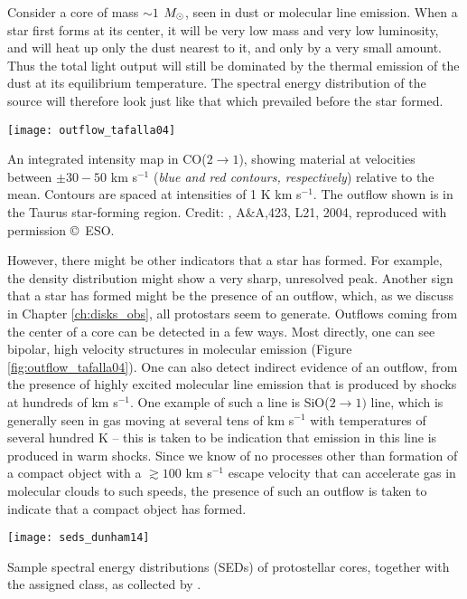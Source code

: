 Consider a core of mass $\sim 1$ $M_{\odot}$, seen in dust or molecular line emission. When a star first forms at its center, it will be very low mass and very low luminosity, and will heat up only the dust nearest to it, and only by a very small amount. Thus the total light output will still be dominated by the thermal emission of the dust at its equilibrium temperature. The spectral energy distribution of the source will therefore look just like that which prevailed before the star formed.

\begin{marginfigure}
\texttt{[image: outflow\_tafalla04]}
\caption[Outflow in CO($2\rightarrow 1$)]{
\label{fig:outflow_tafalla04}
An integrated intensity map in CO($2\rightarrow 1$), showing material at velocities between $\pm 30-50$ km s$^{-1}$ (\textit{blue and red contours, respectively}) relative to the mean. Contours are spaced at intensities of 1 K km s$^{-1}$. The outflow shown is in the Taurus star-forming region. Credit: \citeauthor{tafalla04c}, A\&A,423, L21, 2004, reproduced with permission \copyright\, ESO.
}
\end{marginfigure}

However, there might be other indicators that a star has formed. For example, the density distribution might show a very sharp, unresolved peak. Another sign that a star has formed might be the presence of an outflow, which, as we discuss in Chapter \ref{ch:disks_obs}, all protostars seem to generate. Outflows coming from the center of a core can be detected in a few ways. Most directly, one can see bipolar, high velocity structures in molecular emission (Figure \ref{fig:outflow_tafalla04}). One can also detect indirect evidence of an outflow, from the presence of highly excited molecular line emission that is produced by shocks at hundreds of km s$^{-1}$. One example of such a line is SiO($2\rightarrow 1)$ line, which is generally seen in gas moving at several tens of km s$^{-1}$ with temperatures of several hundred K -- this is taken to be indication that emission in this line is produced in warm shocks. Since we know of no processes other than formation of a compact object with a $\gtrsim 100$ km s$^{-1}$ escape velocity that can accelerate gas in molecular clouds to such speeds, the presence of such an outflow is taken to indicate that a compact object has formed.

\begin{marginfigure}
\texttt{[image: seds\_dunham14]}
\caption[Sample SEDs of protostellar cores]{
\label{fig:seds_dunham14}
Sample spectral energy distributions (SEDs) of protostellar cores, together with the assigned class, as collected by \citet{dunham14a}.
}
\end{marginfigure}

